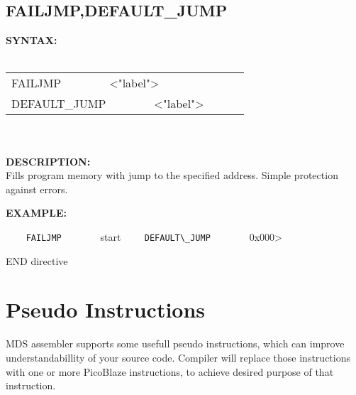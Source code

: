 {                \subsection{FAILJMP,DEFAULT\_JUMP}
                \textbf{SYNTAX:}\\
                \\ {
                        \texttt{}
                        \begin{tabular}[h!]{llll}
                                { \color{highlight_directive} FAILJMP }\verb`       `{ \color{highlight_string} <"label"> }\\
                                { \color{highlight_directive} DEFAULT\_JUMP }\verb`       `{ \color{highlight_string} <"label"> }\\
                        \end{tabular}
                    }\\
                    \\
                \textbf{DESCRIPTION:}\\
                Fills program memory with jump to the specified address. Simple protection against errors.

                \textbf{EXAMPLE:}\\
                    \begin{code}[h!]
                        \verb'    '{\color{highlight_directive}\verb'FAILJMP'}\verb`       `{ \color{highlight_string} start }
                        \verb'    '{\color{highlight_directive}\verb'DEFAULT\_JUMP'}\verb`       `{ \color{highlight_string} 0x000> }
                        \caption{END directive}
                    \end{code}

        \section{Pseudo Instructions}
        MDS assembler supports some usefull pseudo instructions, which can improve understandabillity of your source code.
        Compiler will replace those instructions with one or more PicoBlaze instructions, to achieve desired purpose of that instruction.

}
